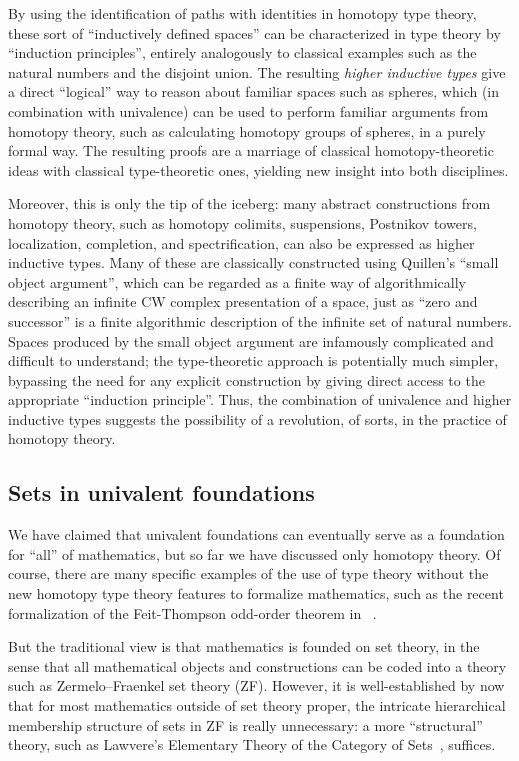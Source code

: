 By using the identification of paths with identities in homotopy type theory, these sort of ``inductively defined spaces'' can be characterized in type theory by ``induction principles'', entirely analogously to classical examples such as the natural numbers and the disjoint union.
The resulting \emph{higher inductive types} give a direct ``logical'' way to reason about familiar spaces such as spheres, which (in combination with univalence) can be used to perform familiar arguments from homotopy theory, such as calculating homotopy groups of spheres, in a purely formal way.
The resulting proofs are a marriage of classical homotopy-theoretic ideas with classical type-theoretic ones, yielding new insight into both disciplines.

Moreover, this is only the tip of the iceberg: many abstract constructions from homotopy theory, such as homotopy colimits, suspensions, Postnikov towers, localization, completion, and spectrification, can also be expressed as higher inductive types.
Many of these are classically constructed using Quillen's ``small object argument'', which can be regarded as a finite way of algorithmically describing an infinite CW complex presentation of a space, just as ``zero and successor'' is a finite algorithmic description of the infinite set of natural numbers.
Spaces produced by the small object argument are infamously complicated and difficult to understand; the type-theoretic approach is potentially much simpler, bypassing the need for any explicit construction by giving direct access to the appropriate ``induction principle''.
Thus, the combination of univalence and higher inductive types suggests the possibility of a revolution, of sorts, in the practice of homotopy theory.


\subsection*{Sets in univalent foundations}

We have claimed that univalent foundations can eventually serve as a foundation for ``all'' of mathematics, but so far we have discussed 
only homotopy theory.  Of course, there are many specific examples of the use of type theory without the new homotopy type theory features to formalize 
mathematics, such as the recent formalization of the  Feit-Thompson odd-order theorem in \Coq~\cite{gonthier}.

But the traditional view is that mathematics is founded on set theory, in the sense that all mathematical objects and constructions can be coded into a theory such as Zermelo--Fraenkel set theory (ZF).
However, it is well-established by now that for most mathematics outside of set theory proper, the intricate hierarchical membership structure of sets in ZF is really unnecessary: a more ``structural'' theory, such as Lawvere's Elementary Theory of the Category of Sets~\cite{lawvere:etcs-long}, suffices.
%

